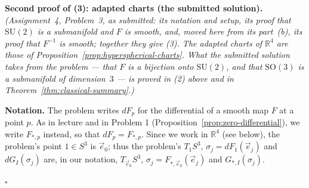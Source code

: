 \documentclass[11pt]{report}
\renewenvironment{proof}[1][Proof]{\noindent\textbf{#1.} }{\hfill$\square$\par\vspace{5pt}}
\newcommand{\SO}{\mathrm{SO}}
\begin{document}
\begin{proof}[Second proof of (3): adapted charts (the submitted solution)]
\textit{(Assignment~4, Problem~3, as submitted: its notation and setup, its proof that $\mathrm{SU}(2)$ is a submanifold and $F$ is smooth, and, moved here from its part~(b), its proof that $F^{-1}$ is smooth; together they give (3). The adapted charts of $\mathbb{R}^4$ are those of Proposition~\ref{prop:hyperspherical-charts}. What the submitted solution takes from the problem --- that $F$ is a bijection onto $\mathrm{SU}(2)$, and that $\SO(3)$ is a submanifold of dimension~$3$ --- is proved in (2) above and in Theorem~\ref{thm:classical-summary}.)}

\textbf{Notation.} The problem writes $dF_p$ for the differential of a smooth map $F$ at a point $p$. As in lecture and in Problem 1 (Proposition~\ref{prop:zero-differential}), we write $F_{*,p}$ instead, so that $dF_p = F_{*,p}$. Since we work in $\mathbb{R}^4$ (see below), the problem's point $1 \in S^3$ is $\vec e_0$; thus the problem's $T_1 S^3$, $\sigma_j = dF_1(\vec e_j)$ and $dG_I(\sigma_j)$ are, in our notation, $T_{\vec e_0} S^3$, $\sigma_j = F_{*,\vec e_0}(\vec e_j)$ and $G_{*,I}(\sigma_j)$.


\end{proof}
\end{document}
